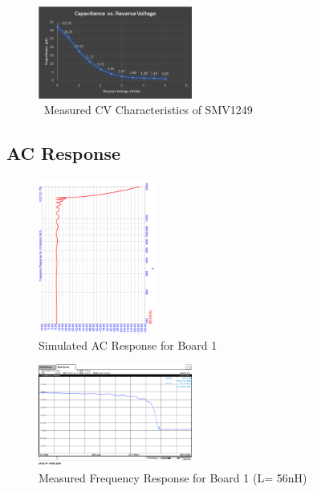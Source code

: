 \documentclass[journal]{IEEEtran} \usepackage[english]{babel}
\begin{document}
 
\begin{figure}[htb]
\centering
\includegraphics[width=0.45\textwidth]{SMV1249_CV}
\caption{\ Measured CV Characteristics of SMV1249 
}\label{fig:SMV1249CV}
\end{figure}


\subsection{AC Response}\label{ACMeasResults}


\begin{figure}[htb]
\centering
\includegraphics[width=0.35\textwidth,angle = -90]{ACResponseB1}
\caption{Simulated AC Response for Board 1}
\label{fig:simACBoard1}
\end{figure}

\begin{figure}[htb]
\centering
\includegraphics[width=0.45\textwidth]{MeasuredACResponseB1.png}
\caption{Measured Frequency Response for Board 1 (L= 56nH)}
\label{fig:MeasACBoard1}
\end{figure}
\end{document}

